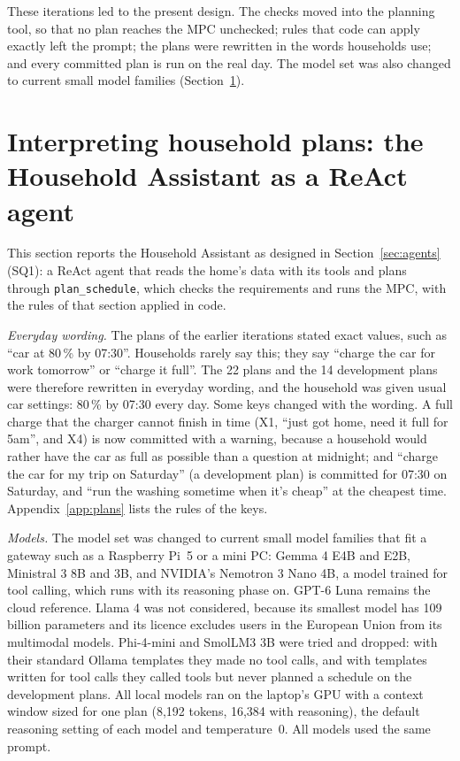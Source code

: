 These iterations led to the present design. The checks moved into the
planning tool, so that no plan reaches the MPC unchecked; rules that
code can apply exactly left the prompt; the plans were rewritten in the
words households use; and every committed plan is run on the real day.
The model set was also changed to current small model families
(Section~\ref{sec:reactpilot}).

\section{Interpreting household plans: the Household Assistant as a ReAct agent}
\label{sec:reactpilot}

This section reports the Household Assistant as designed in
Section~\ref{sec:agents} (SQ1): a ReAct agent that reads the home's
data with its tools and plans through \texttt{plan\_schedule}, which
checks the requirements and runs the MPC, with the rules of that
section applied in code.

\textit{Everyday wording.} The plans of the earlier iterations stated
exact values, such as ``car at 80\,\% by 07:30''. Households rarely say
this; they say ``charge the car for work tomorrow'' or ``charge it
full''. The 22 plans and the 14 development plans were therefore
rewritten in everyday wording, and the household was given usual car
settings: 80\,\% by 07:30 every day. Some keys changed with the
wording. A full charge that the charger cannot finish in time (X1,
``just got home, need it full for 5am'', and X4) is now committed with
a warning, because a household would rather have the car as full as
possible than a question at midnight; and ``charge the car for my trip
on Saturday'' (a development plan) is committed for 07:30 on Saturday,
and ``run the washing sometime when it's cheap'' at the cheapest time.
Appendix~\ref{app:plans} lists the rules of the keys.

\textit{Models.} The model set was changed to current small model
families that fit a gateway such as a Raspberry Pi~5 or a mini PC: Gemma 4 E4B
and E2B, Ministral 3 8B and 3B, and NVIDIA's Nemotron 3 Nano 4B, a
model trained for tool calling, which runs with its reasoning phase on.
GPT-6 Luna remains the cloud reference. Llama 4 was not considered,
because its smallest model has 109 billion parameters and its licence
excludes users in the European Union from its multimodal models.
Phi-4-mini and SmolLM3 3B were tried and dropped: with their standard
Ollama templates they made no tool calls, and with templates written
for tool calls they called tools but never planned a schedule on the
development plans. All local models ran on the laptop's GPU with a
context window sized for one plan (8,192 tokens, 16,384 with
reasoning), the default reasoning setting of each model and
temperature~0. All models used the same prompt.

